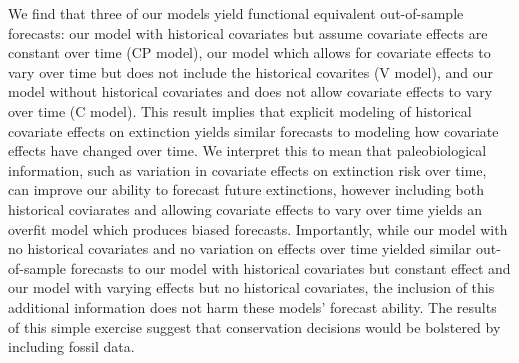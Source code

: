 \documentclass[12pt,letterpaper]{article}
\begin{document}
\begin{refsection}
We find that three of our models yield functional equivalent out-of-sample forecasts: our model with historical covariates but assume covariate effects are constant over time (CP model), our model which allows for covariate effects to vary over time but does not include the historical covarites (V model), and our model without historical covariates and does not allow covariate effects to vary over time (C model). This result implies that explicit modeling of historical covariate effects on extinction yields similar forecasts to modeling how covariate effects have changed over time. We interpret this to mean that paleobiological information, such as variation in covariate effects on extinction risk over time, can improve our ability to forecast future extinctions, however including both historical coviarates and allowing covariate effects to vary over time yields an overfit model which produces biased forecasts. Importantly, while our model with no historical covariates and no variation on effects over time yielded similar out-of-sample forecasts to our model with historical covariates but constant effect and our model with varying effects but no historical covariates, the inclusion of this additional information does not harm these models' forecast ability. The results of this simple exercise suggest that conservation decisions would be bolstered by including fossil data.



\printbibliography
\end{refsection}
\clearpage
\end{document}
